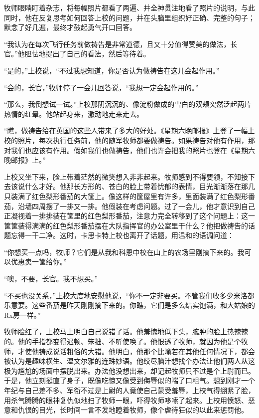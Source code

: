  


    牧师眼睛盯着杂志，将每幅照片都看了两遍、并全神贯注地看了照片的说明，与此同时，他在反复思考如何回答上校的问题，并在头脑里组织好正确、完整的句子；默念了好几遍，最终才鼓起勇气开口回答。

    “我认为在每次飞行任务前做祷告是非常道德，且又十分值得赞美的做法，长官。”他胆怯地提出了自己的看法，然后等待着。

    “是的，”上校说，“不过我想知道，你是否认为做祷告在这儿会起作用。”

    “会的，长官，”牧师停了一会儿回答说，“我想一定会起作用的。”

    “那么，我倒想试一试。”上校那阴沉沉的、像淀粉做成的雪白的双颊突然泛起两片热情的红晕。他站起身来，激动地走来走去。

    “瞧，做祷告给在英国的这些人带来了多大的好处。《星期六晚邮报》上登了一幅上校的照片，每次执行任务前，他的随军牧师都要做祷告。如果祷告对他有作用，那对我们也应该有作用。假如我们也做祷告，他们也许会把我的照片也登在《星期六晚邮报》上。”

    上校又坐下来，脸上带着茫然的微笑想入非非起来。牧师感到不得要领，不知接下去该说什么才好。他那长方形的、苍白的脸上带着忧郁的表情，目光渐渐落在那几只装满了红色梨形番茄的大筐上。像这样的筐屋里有许多，里面装满了红色梨形番茄，沿墙四周摆了一排又一排。他假装在考虑问题。过了一会儿，他才意识到自己正凝视着一排排装在筐里的红色梨形番茄，注意力完全转移到了这个问题上：这一筐筐装得满满的红色梨形番茄摆在大队指挥官的办公室里干什么？他把做祷告的话题忘得一干二净。这时，卡思卡特上校也离开了话题，用温和的语调问道：

    “你想买一点吗，牧师？它们是从我和科恩中校在山上的农场里刚摘下来的。我可以优惠卖一筐给你。”

    “噢，不要，长官。我不想买。”

    “不买也没关系，”上校大度地安慰他说，“你不一定非要买。不管我们收多少米洛都乐意要。这些番茄是昨天刚刚摘下来的。你瞧，它们是多么结实饱满，和大姑娘的Rx房一样。”

    牧师脸红了，上校马上明白自己说错了话。他羞愧地低下头，臃肿的脸上热辣辣的。他的手指都变得迟顿、笨拙、不听使唤了。他恨透了牧师，就因为他是个牧师，才使他铸成说话粗俗的大错。他明白，他那个比喻若在其他任何情况下，都会被认为是趣味横生、温文尔雅的连珠妙语。他绞尽脑汁想找个办法让他们两人从这极为尴尬的场面中摆脱出来。办法他没想出来，却记起牧师只不过是个上尉而已。于是，他立刻挺直了身子，既像吃惊又像受到侮辱似的喘了口粗气。想到刚才一个年纪与自己差不多、军衔不过是上尉的人竟使自己蒙受羞辱，上校气得绷紧了脸，用杀气腾腾的眼神复仇似地扫了牧师一眼，吓得牧师哆嗦了起来。上校用愤怒、恶意和仇恨的目光，长时间一言不发地瞪着牧师，像个虐待狂似的以此来惩罚他。
 


